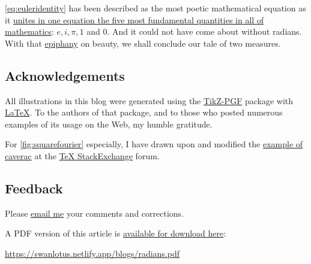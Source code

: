 \documentclass[
  a4paper,
]{article}
\begin{document}
\cref{eq:euleridentity} has been described as the most poetic
mathematical equation as it
\href{https://www.livescience.com/51399-eulers-identity.html}{unites in
one equation the five most fundamental quantities in all of
mathematics}: \(e, i, \pi, 1\) and \(0\). And it could not have come
about without radians. With that
\href{https://www.thefreedictionary.com/epiphany}{epiphany} on beauty,
we shall conclude our tale of two measures.

\hypertarget{acknowledgements}{%
\subsection{Acknowledgements}\label{acknowledgements}}

All illustrations in this blog were generated using the
\href{https://github.com/pgf-tikz/pgf}{TikZ-PGF} package with
\href{https://www.latex-project.org/}{LaTeX}. To the authors of that
package, and to those who posted numerous examples of its usage on the
Web, my humble gratitude.

For \cref{fig:squarefourier} especially, I have drawn upon and modified
the \href{https://tex.stackexchange.com/a/429505/1636}{example of
caverac} at the \href{https://tex.stackexchange.com/}{TeX StackExchange}
forum.

\hypertarget{feedback}{%
\subsection{Feedback}\label{feedback}}

Please \href{mailto:feedback.swanlotus@gmail.com}{email me} your
comments and corrections.

\noindent A PDF version of this article is
\href{./radians.pdf}{available for download here}:

\begin{small}

\begin{sffamily}

\url{https://swanlotus.netlify.app/blogs/radians.pdf}

\end{sffamily}

\end{small}
\end{document}
